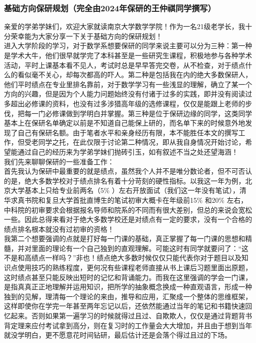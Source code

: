 \documentclass[a4paper,11pt,notitlepage]{article}
\begin{document}
\subsubsection{基础方向保研规划（完全由2024年保研的王仲祺同学撰写）}
亲爱的学弟学妹们，欢迎大家就读南京大学数学学院！作为一名21级老学长，我十分荣幸能为大家分享一下关于基础方向的保研规划！\\
\indent 进入大学阶段的学习，对于数学系想要保研的同学来说主要可以分为三种：第一种是学术大牛，他们很早就学完了本科甚至是一些研究生课程，积极地参与各种学术活动，平时上课基本看不见人，考试时总是早早答完交卷，从不检查，对于绩点什么的看似毫不关心，却每次都高的吓人。第二种是包括我在内的绝大多数保研人，他们平时绩点在专业里排名靠前，对于数学学习有一些浅显的理解，确立了某一个方向的兴趣，但是因为个人能力问题始终没有付诸于过多的实践，即并没有阅读过多超出必修课的资料，也没有过多涉猎高年级的选修课程，仅仅是能跟上老师的步伐，把每一门必修课做到学明白并掌握。第三种是位于保研边缘的同学，这类同学基本上在保研名单确定以前是不知道自己能保上研的，而名单下来的时候意外地发现了自己有保研名额。由于笔者水平和亲身经历有限，本不能胜任本文的撰写工作，但受老同学之托，在此仅限于讨论第二种情况，即从我自身情况开始讨论，希望能通过自己的经历来为学弟学妹们抛砖引玉，如有叙述不当之处还望海涵！\\
\indent 我们先来聊聊保研的一些准备工作：\\
\indent 首先我认为保研中最重要的就是绩点，虽然我个人并不是唯分数论者，但不可否认的是，绝大多数学校对于绩点排名有着十分苛刻的硬性指标。以我这一年为例，北京大学基本上只给专业前两名（5\% ）左右开放面试（我们这一年没有笔试），清华求真书院和复旦大学首批直博生的笔试初审大概卡在年级前15\% 和20\% 左右，中科院的初审要求会根据报名导师和院系的不同而有很大差别，但总的来说会宽松一些。因此总得来看对于绝大多数学校还是对绩点有一定的要求，没有一个合格的绩点排名根本就没有过初审的资格！\\
\indent 我第二个想要强调的点就是打好每一门课的基础，真正掌握了每一门课的思想和精髓，并对里面的理论有一个自己独到的直观理解。可能这时有同学就要问了：“这不是和高绩点一样吗？”非也！绩点绝大多数时候仅仅只能代表你对于题目以及知识点使用技巧的熟练程度，更何况有些课程老师直接从书上课后习题里面出原题，这时绩点甚至只能反映出短时的记忆和背诵能力。而我在这里强调的学会一门课，是指真真正正地理解并运用知识，把所学的抽象概念换成一种直观语言，形成一种独到的见解，理清每一个理论的来由，推导和应用，汇聚成一个整体的思维框架，这样即使你在学完一年甚至两年忘记以后，还依然能通过当年的笔记和书籍快速回忆起来。否则如果第一遍学习的时候就得过且过、自欺欺人，仅仅是通过背题背书背定理来应付考试拿到高分，则在复习时的工作量会大大增加，并且由于想到当年就没学明白，更不愿意花时间钻研，最后估计还是会落个得过且过的下场。\\
\end{document}
